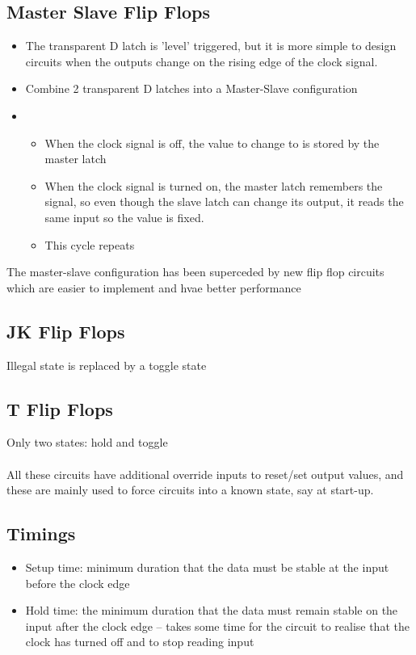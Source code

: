 \documentclass[12pt,a4paper]{article} %
\begin{document}
\subsection{Master Slave Flip Flops}
\begin{itemize}
\item The transparent D latch is 'level' triggered, but it is more simple to design circuits when the outputs change on the rising edge of the clock signal.
\item Combine 2 transparent D latches into a Master-Slave configuration
\item \begin{itemize}
\item When the clock signal is off, the value to change to is stored by the master latch
\item When the clock signal is turned on, the master latch remembers the signal, so even though the slave latch can change its output, it reads the same input so the value is fixed.
\item This cycle repeats
\end{itemize}
\end{itemize}
The master-slave configuration has been superceded by new flip flop circuits which are easier to implement and hvae better performance
\subsection{JK Flip Flops}
Illegal state is replaced by a toggle state
\subsection{T Flip Flops}
Only two states: hold and toggle
\\\\
All these circuits have additional override inputs to reset/set output values, and these are mainly used to force circuits into a known state, say at start-up.
\subsection{Timings}
\begin{itemize}
\item Setup time: minimum duration that the data must be stable at the input before the clock edge
\item Hold time: the minimum duration that the data must remain stable on the input after the clock edge -- takes some time for the circuit to realise that the clock has turned off and to stop reading input
\end{itemize}
\end{document}
